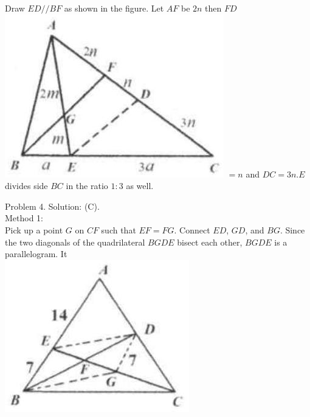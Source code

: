\documentclass[10pt]{article}
\begin{document}
Draw \(E D / / B F\) as shown in the figure. Let \(A F\) be \(2 n\) then \(F D\)\\
\includegraphics[max width=\textwidth]{2025_04_17_97bc1f7e44d93c271a88g-132(3)} \(=n\) and \(D C=3 n . E\) divides side \(B C\) in the ratio \(1: 3\) as well.

Problem 4. Solution: (C).\\
Method 1:\\
Pick up a point \(G\) on \(C F\) such that \(E F=F G\). Connect \(E D\), \(G D\), and \(B G\). Since the two diagonals of the quadrilateral \(B G D E\) bisect each other, \(B G D E\) is a parallelogram. It\\
\includegraphics[max width=\textwidth, center]{2025_04_17_97bc1f7e44d93c271a88g-132(2)}
\end{document}
